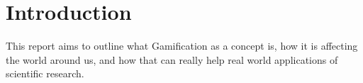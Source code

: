 \section{Introduction}\label{sec:introduction}
This report aims to outline what Gamification as a concept is, how it is affecting the world around us, and how that can really help real world applications of scientific research. 